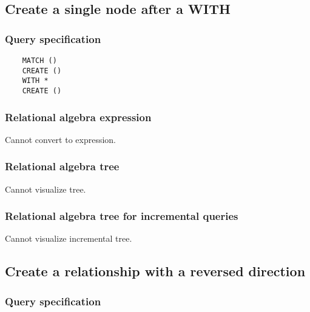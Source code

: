 	\subsection{Create a single node after a WITH}

	\subsubsection*{Query specification}

	\begin{lstlisting}
	MATCH ()
	CREATE ()
	WITH *
	CREATE ()
	\end{lstlisting}


	\subsubsection*{Relational algebra expression}

	Cannot convert to expression.

	\subsubsection*{Relational algebra tree}

	Cannot visualize tree.

	\subsubsection*{Relational algebra tree for incremental queries}

	Cannot visualize incremental tree.
	\subsection{Create a relationship with a reversed direction}

	\subsubsection*{Query specification}


